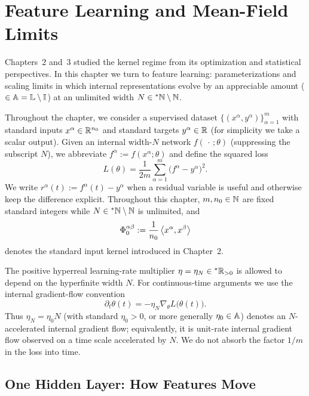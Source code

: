 \chapter{Feature Learning and Mean-Field Limits}
\label{ch:feature-learning}

Chapters~2 and~3 studied the kernel regime from its optimization and statistical perspectives. In this chapter we turn to feature learning: parameterizations and scaling limits in which internal representations evolve by an appreciable amount ($\in \mathbb{A} = \mathbb{L} \setminus \mathbb{I}$) at an unlimited width $N \in {}^*\mathbb{N} \setminus \mathbb{N}$.

Throughout the chapter, we consider a supervised dataset $\{(x^\alpha, y^\alpha)\}_{\alpha=1}^m$ with standard inputs $x^\alpha \in \mathbb{R}^{n_0}$ and standard targets $y^\alpha \in \mathbb{R}$ (for simplicity we take a scalar output). Given an internal width-$N$ network $f(\,\cdot\,; \theta)$ (suppressing the subscript $N$), we abbreviate $f^\alpha := f(x^\alpha; \theta)$ and define the squared loss
\begin{equation}\label{eq:4.1}
L(\theta) = \frac{1}{2m} \sum_{\alpha=1}^m \bigl(f^\alpha - y^\alpha\bigr)^2.
\end{equation}
We write $r^\alpha(t) := f^\alpha(t) - y^\alpha$ when a residual variable is useful and otherwise keep the difference explicit. Throughout this chapter, $m, n_0 \in \mathbb{N}$ are fixed standard integers while $N \in {}^*\mathbb{N} \setminus \mathbb{N}$ is unlimited, and
\begin{equation}\label{eq:4.2}
\Phi_0^{\alpha\beta} := \frac{1}{n_0}\left\langle x^\alpha, x^\beta \right\rangle
\end{equation}
denotes the standard input kernel introduced in Chapter~2.

The positive hyperreal learning-rate multiplier $\eta = \eta_N \in {}^*\mathbb{R}_{>0}$ is allowed to depend on the hyperfinite width $N$. For continuous-time arguments we use the internal gradient-flow convention
\begin{equation}\label{eq:4.3}
\partial_t \theta(t) = -\eta_N \nabla_\theta L\bigl(\theta(t)\bigr).
\end{equation}
Thus $\eta_N = \eta_0 N$ (with standard $\eta_0 > 0$, or more generally $\eta_0 \in \mathbb{A}$) denotes an $N$-accelerated internal gradient flow; equivalently, it is unit-rate internal gradient flow observed on a time scale accelerated by $N$. We do not absorb the factor $1/m$ in the loss into time.

\section{One Hidden Layer: How Features Move}
\label{sec:4.1}

